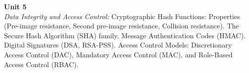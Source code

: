 \vspace{0.3cm}

\noindent\textbf{Unit 5} \\
\textit{Data Integrity and Access Control:} Cryptographic Hash Functions: Properties (Pre-image resistance, Second pre-image resistance, Collision resistance). The Secure Hash Algorithm (SHA) family. Message Authentication Codes (HMAC). Digital Signatures (DSA, RSA-PSS). Access Control Models: Discretionary Access Control (DAC), Mandatory Access Control (MAC), and Role-Based Access Control (RBAC).

\newpage
{}